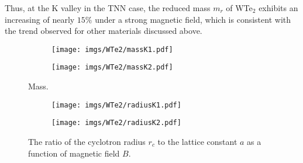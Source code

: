 \documentclass{article}
\begin{document}
Thus, at the K valley in the TNN case, the reduced mass $m_r$ of WTe$_{2}$ exhibits an increasing of nearly $15\%$ under a strong magnetic field, which is consistent with the trend observed for other materials discussed above.

\begin{figure}[htb]
	\begin{subfigure}{0.495\textwidth}
		\centering
		\texttt{[image: imgs/WTe2/massK1.pdf]}
	\end{subfigure}
	\begin{subfigure}{0.495\textwidth}
		\centering
		\texttt{[image: imgs/WTe2/massK2.pdf]}
	\end{subfigure}
	\caption{Mass.}
\end{figure}
\begin{figure}[!h]
	\begin{subfigure}{0.495\textwidth}
		\centering
		\texttt{[image: imgs/WTe2/radiusK1.pdf]}
	\end{subfigure}
	\begin{subfigure}{0.495\textwidth}
		\centering
		\texttt{[image: imgs/WTe2/radiusK2.pdf]}
	\end{subfigure}
	\caption{The ratio of the cyclotron radius $r_c$ to the lattice constant $a$ as a function of magnetic field $B$.}
\end{figure}

\newpage



\end{document}
